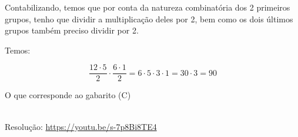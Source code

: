 Contabilizando, temos que por conta da natureza combinatória dos 2 primeiros grupos, tenho que dividir a multiplicação deles por 2, bem como os dois últimos grupos também preciso dividir por 2.

Temos:

\[
\dfrac{12 \cdot 5}{2} \cdot \dfrac{6 \cdot 1}{2} = 6 \cdot 5 \cdot 3 \cdot 1 = 30 \cdot 3 = 90
\]

O que corresponde ao gabarito (C)

\begin{center}
    \href{https://youtu.be/s-7p8Bi8TE4}{
    }\\
    Resolução: \url{https://youtu.be/s-7p8Bi8TE4}
\end{center}
